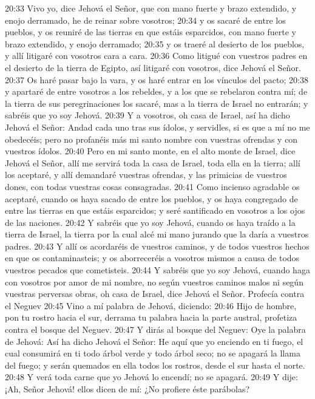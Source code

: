 20:33 Vivo yo, dice Jehová el Señor, que con mano fuerte y brazo extendido, y enojo derramado, he de reinar sobre vosotros;   
20:34 y os sacaré de entre los pueblos, y os reuniré de las tierras en que estáis esparcidos, con mano fuerte y brazo extendido, y enojo derramado;   
20:35 y os traeré al desierto de los pueblos, y allí litigaré con vosotros cara a cara.   
20:36 Como litigué con vuestros padres en el desierto de la tierra de Egipto, así litigaré con vosotros, dice Jehová el Señor.   
20:37 Os haré pasar bajo la vara, y os haré entrar en los vínculos del pacto;   
20:38 y apartaré de entre vosotros a los rebeldes, y a los que se rebelaron contra mí; de la tierra de sus peregrinaciones los sacaré, mas a la tierra de Israel no entrarán; y sabréis que yo soy Jehová.   
20:39 Y a vosotros, oh casa de Israel, así ha dicho Jehová el Señor: Andad cada uno tras sus ídolos, y servidles, si es que a mí no me obedecéis; pero no profanéis más mi santo nombre con vuestras ofrendas y con vuestros ídolos.   
20:40 Pero en mi santo monte, en el alto monte de Israel, dice Jehová el Señor, allí me servirá toda la casa de Israel, toda ella en la tierra; allí los aceptaré, y allí demandaré vuestras ofrendas, y las primicias de vuestros dones, con todas vuestras cosas consagradas.   
20:41 Como incienso agradable os aceptaré, cuando os haya sacado de entre los pueblos, y os haya congregado de entre las tierras en que estáis esparcidos; y seré santificado en vosotros a los ojos de las naciones.   
20:42 Y sabréis que yo soy Jehová, cuando os haya traído a la tierra de Israel, la tierra por la cual alcé mi mano jurando que la daría a vuestros padres.   
20:43 Y allí os acordaréis de vuestros caminos, y de todos vuestros hechos en que os contaminasteis; y os aborreceréis a vosotros mismos a causa de todos vuestros pecados que cometisteis.   
20:44 Y sabréis que yo soy Jehová, cuando haga con vosotros por amor de mi nombre, no según vuestros caminos malos ni según vuestras perversas obras, oh casa de Israel, dice Jehová el Señor.   
Profecía contra el Neguev   
20:45 Vino a mí palabra de Jehová, diciendo:   
20:46 Hijo de hombre, pon tu rostro hacia el sur, derrama tu palabra hacia la parte austral, profetiza contra el bosque del Neguev.   
20:47 Y dirás al bosque del Neguev: Oye la palabra de Jehová: Así ha dicho Jehová el Señor: He aquí que yo enciendo en ti fuego, el cual consumirá en ti todo árbol verde y todo árbol seco; no se apagará la llama del fuego; y serán quemados en ella todos los rostros, desde el sur hasta el norte.   
20:48 Y verá toda carne que yo Jehová lo encendí; no se apagará.   
20:49 Y dije: ¡Ah, Señor Jehová! ellos dicen de mí: ¿No profiere éste parábolas?   
